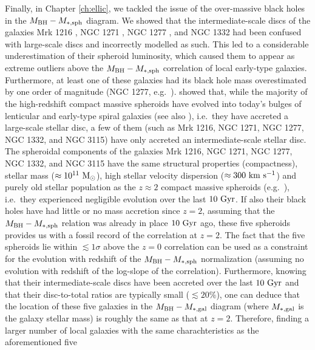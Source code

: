 Finally, in Chapter \ref{ch:ellic}, 
we tackled the issue of the over-massive black holes in the $M_{\rm BH} - M_{\rm *,sph}$ diagram. 
We showed that the intermediate-scale discs of the galaxies Mrk 1216 \citep{yildirim2015}, NGC 1271 \citep{walsh2015}, 
NGC 1277 \citep{vandenbosch2012}, and NGC 1332 \citep{rusli2011} 
had been confused with large-scale discs and incorrectly modelled as such. 
This led to a considerable underestimation of their spheroid luminosity, 
which caused them to appear as extreme outliers above the $M_{\rm BH} - M_{\rm *,sph}$ correlation 
of local early-type galaxies. 
Furthermore, at least one of these galaxies had its black hole mass overestimated by one order of magnitude 
(NGC 1277, e.g.~\citealt{Graham2016n1277}). 
\cite{gds2015} showed that, while the majority of the high-redshift compact massive spheroids 
have evolved into today's bulges of lenticular and early-type spiral galaxies (see also \citealt{graham2013review}), 
i.e.~they have accreted a large-scale stellar disc, 
a few of them (such as Mrk 1216, NGC 1271, NGC 1277, NGC 1332, and NGC 3115) 
have only accreted an intermediate-scale stellar disc. 
The spheroidal components of the galaxies Mrk 1216, NGC 1271, NGC 1277, NGC 1332, and NGC 3115 
have the same structural properties (compactness), stellar mass ($\approx 10^{11} \rm~M_\odot$), 
high stellar velocity dispersion ($\approx 300 \rm~km~s^{-1}$) and purely old stellar population 
as the $z \approx 2$ compact massive spheroids (e.g.~\citealt{daddi2005,trujillo2006,vandokkum2008,damjanov2009}), 
i.e.~they experienced negligible evolution over the last $10 \rm~Gyr$. 
If also their black holes have had little or no mass accretion since $z = 2$, 
assuming that the $M_{\rm BH} - M_{\rm *,sph}$ relation was already in place $10 \rm~Gyr$ ago, 
these five spheroids provides us with a fossil record of the correlation at $z=2$. 
The fact that the five spheroids lie within $\lesssim 1\sigma$ above the $z=0$ correlation 
can be used as a constraint for the evolution with redshift of the $M_{\rm BH} - M_{\rm *,sph}$ normalization 
(assuming no evolution with redshift of the log-slope of the correlation). 
Furthermore, knowing that their intermediate-scale discs have been accreted over the last $10 \rm~Gyr$ 
and that their disc-to-total ratios are typically small ($\lesssim 20\%$), 
one can deduce that the location of these five galaxies in the $M_{\rm BH} - M_{\rm *,gal}$ diagram 
(where $M_{\rm *,gal}$ is the galaxy stellar mass) 
is roughly the same as that at $z=2$. 
Therefore, finding a larger number of local galaxies with the same charachteristics as the aforementioned five 

